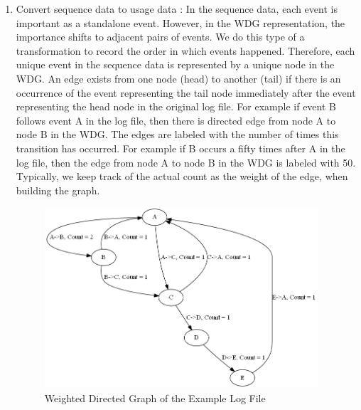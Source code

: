 \begin{enumerate}
                \begin{enumerate}
                \item Convert sequence data to usage data :
In the sequence data, each event is important as a standalone event. However, in the WDG representation, the importance shifts to adjacent pairs of events. We do this type of a transformation to record the order in which events happened. Therefore, each unique event in the sequence data is represented by a unique node in the WDG. An edge exists from one node (head) to another (tail) if there is an occurrence of the event representing the tail node immediately after the event representing the head node in the original log file. For example if event B follows event A in the log file, then there is directed edge from node A to node B in the WDG. The edges are labeled with the number of times this transition has occurred.  For example if B occurs a fifty times after A in the log file, then the edge from node A to node B in the WDG is labeled with 50. Typically, we keep track of the actual count as the weight of the edge, when building the graph. 
\begin{figure}[!t]
\centering
\includegraphics[width=4in]{Graphics/op-profile-example.png}
\caption{Weighted Directed Graph of the Example Log File}
\label{WDG_example}
\end{figure}


\end{enumerate}
\end{enumerate}
